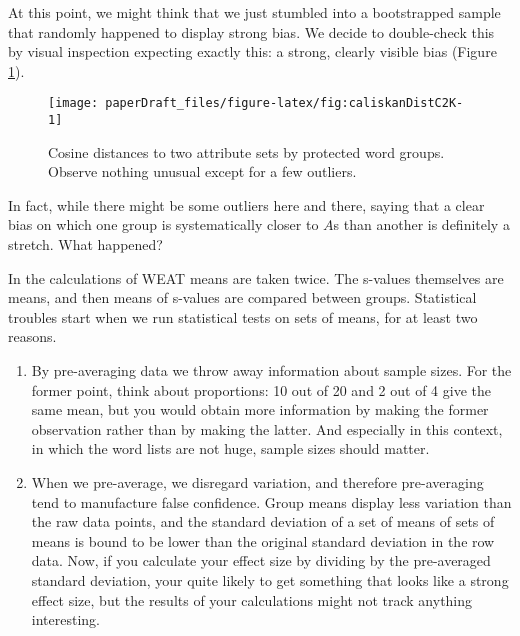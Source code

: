 \documentclass[
  12pt,
  dvipsnames,enabledeprecatedfontcommands]{scrartcl}
\begin{document}
At this point, we might think that we just stumbled into a bootstrapped
sample that randomly happened to display strong bias. We decide to
double-check this by visual inspection expecting exactly this: a strong,
clearly visible bias (Figure \ref{fig:caliskanDistances}).

\begin{figure}[H]

\begin{center}\texttt{[image: paperDraft\_files/figure-latex/fig:caliskanDistC2K-1]} \end{center}

\caption{Cosine distances to two attribute sets by protected word groups. Observe nothing unusual except for a few outliers.}
\label{fig:caliskanDistances}
\end{figure}

\noindent In fact, while there might be some outliers here and there,
saying that a clear bias on which one group is systematically closer to
\(A\)s than another is definitely a stretch. What happened?

In the calculations of \textsf{WEAT} means are taken twice. The
\textsf{s}-values themselves are means, and then means of
\textsf{s}-values are compared between groups. Statistical troubles
start when we run statistical tests on sets of means, for at least two
reasons.

\begin{enumerate}

\item By pre-averaging data we throw away information about sample sizes. For the former point, think about proportions: 10 out of 20 and 2 out of 4 give the same mean, but you would obtain more information by making the former observation rather than by making the latter.  And especially in this context, in which the word lists are not huge, sample sizes should matter.

\item When we pre-average, we disregard variation, and therefore pre-averaging  tend to manufacture false confidence. Group means display less variation than the raw data points, and the standard deviation of a set of means of sets of means is bound to be lower than the original standard deviation in the row data. Now, if you calculate your effect size by dividing by the pre-averaged standard deviation, your quite likely to get something that looks like a strong effect size, but the results of your calculations might not track anything interesting.
\end{enumerate}
\end{document}
